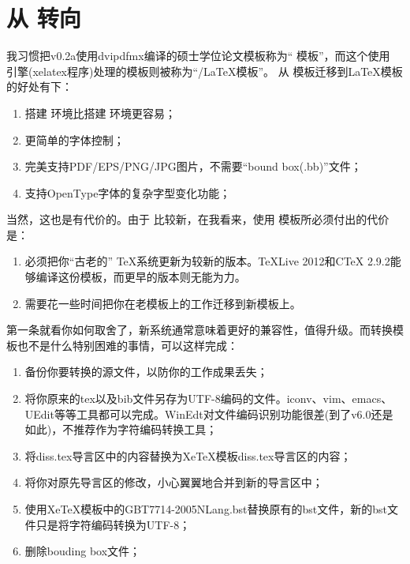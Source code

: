 \chapter{从 {\CJKLaTeX} 转向 \texorpdfstring{\XeTeX}{XeTeX}}
\label{chap:whydvipdfm}

我习惯把v0.2a使用dvipdfmx编译的硕士学位论文模板称为“ \CJKLaTeX 模板”，而这个使用 \XeTeX 引擎(xelatex程序)处理的模板则被称为“{\XeTeX/\LaTeX}模板”。
从 \CJKLaTeX 模板迁移到{\XeTeX\LaTeX}模板的好处有下：
\begin{enumerate}
\item[\large\smiley] 搭建 \XeTeX 环境比搭建 \CJKLaTeX 环境更容易；
\item[\large\smiley] 更简单的字体控制；
\item[\large\smiley] 完美支持PDF/EPS/PNG/JPG图片，不需要“bound box(.bb)”文件；
\item[\large\smiley] 支持OpenType字体的复杂字型变化功能；
\end{enumerate}

当然，这也是有代价的。由于 \XeTeX 比较新，在我看来，使用 \XeTeX 模板所必须付出的代价是：

\begin{enumerate}
\item[\large\frownie] 必须把你“古老的” \TeX 系统更新为较新的版本。TeXLive 2012和CTeX 2.9.2能够编译这份模板，而更早的版本则无能为力。
\item[\large\frownie] 需要花一些时间把你在老模板上的工作迁移到新模板上。
\end{enumerate}

第一条就看你如何取舍了，新系统通常意味着更好的兼容性，值得升级。而转换模板也不是什么特别困难的事情，可以这样完成：

\begin{enumerate}
\item 备份你要转换的源文件，以防你的工作成果丢失；
\item 将你原来的tex以及bib文件另存为UTF-8编码的文件。iconv、vim、emacs、UEdit等等工具都可以完成。WinEdt对文件编码识别功能很差(到了v6.0还是如此)，不推荐作为字符编码转换工具；
\item 将diss.tex导言区中的内容替换为XeTeX模板diss.tex导言区的内容；
\item 将你对原先导言区的修改，小心翼翼地合并到新的导言区中；
\item 使用XeTeX模板中的GBT7714-2005NLang.bst替换原有的bst文件，新的bst文件只是将字符编码转换为UTF-8；
\item 删除bouding box文件；
\end{enumerate}

